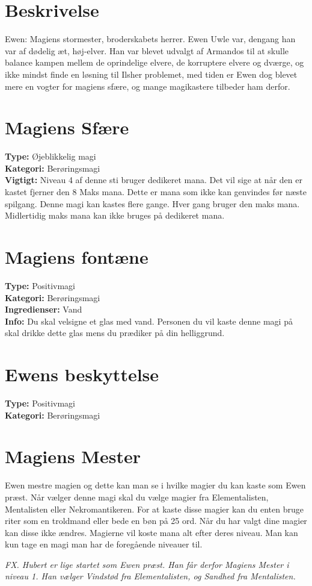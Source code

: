 \section{Beskrivelse}
Ewen: Magiens stormester, broderskabets herrer. Ewen Uwle var, dengang han var af dødelig æt, høj-elver. Han var blevet udvalgt af Armandos til at skulle balance kampen mellem de oprindelige elvere, de korruptere elvere og dværge, og ikke mindst finde en løsning til Ilsher problemet, med tiden er Ewen dog blevet mere en vogter for magiens sfære, og mange magikastere tilbeder ham derfor.

\section{Magiens Sfære}
\textbf{Type:} Øjeblikkelig magi \\
\textbf{Kategori:} Berøringsmagi\\
\textbf{Vigtigt:} Niveau 4 af denne sti bruger dedikeret mana. Det vil sige at når den er kastet fjerner den 8 Maks mana. Dette er mana som ikke kan genvindes før næste spilgang. Denne magi kan kastes flere gange. Hver gang bruger den maks mana. Midlertidig maks mana kan ikke bruges på dedikeret mana.

\section{Magiens fontæne}
\textbf{Type:} Positivmagi\\
\textbf{Kategori:} Berøringsmagi\\
\textbf{Ingredienser:} Vand\\
\textbf{Info:} Du skal velsigne et glas med vand. Personen du vil kaste denne magi på skal drikke dette glas mens du prædiker på din helliggrund.

\section{Ewens beskyttelse}
\textbf{Type:} Positivmagi\\
\textbf{Kategori:} Berøringsmagi\\

\section{Magiens Mester}
Ewen mestre magien og dette kan man se i hvilke magier du kan kaste som Ewen præst. Når vælger denne magi skal du vælge magier fra Elementalisten, Mentalisten eller Nekromantikeren. For at kaste disse magier kan du enten bruge riter som en troldmand eller bede en bøn på 25 ord. Når du har valgt dine magier kan disse ikke ændres. Magierne vil koste mana alt efter deres niveau. Man kan kun tage en magi man har de foregående niveauer til.

\textit{FX. Hubert er lige startet som Ewen præst. Han får derfor Magiens Mester i niveau 1. Han vælger Vindstød fra Elementalisten, og Sandhed fra Mentalisten.}

